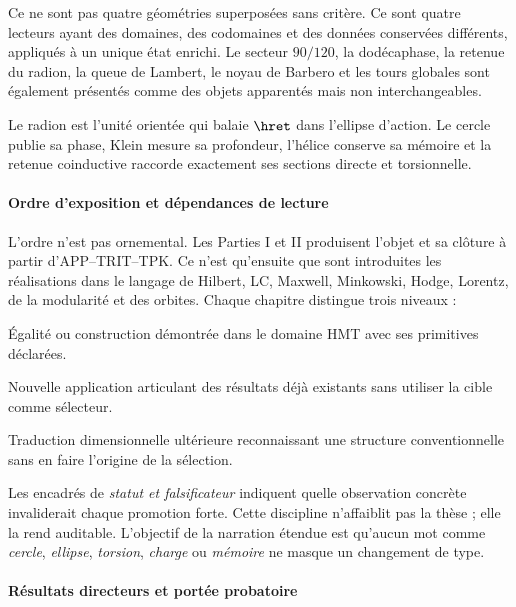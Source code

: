 Ce ne sont pas quatre géométries superposées sans critère. Ce sont quatre lecteurs ayant
des domaines, des codomaines et des données conservées différents, appliqués à un unique état
enrichi. Le secteur \(90/120\), la dodécaphase, la retenue du radion, la queue
de Lambert, le noyau de Barbero et les tours globales sont également présentés
comme des objets apparentés mais non interchangeables.

\begin{thesisbox}
Le radion est l'unité orientée qui balaie \(\hret\) dans l'ellipse d'action.
Le cercle publie sa phase, Klein mesure sa profondeur, l'hélice conserve sa
mémoire et la retenue coinductive raccorde exactement ses sections directe et
torsionnelle.
\end{thesisbox}

\paragraph{Ordre d'exposition et dépendances de lecture}

L'ordre n'est pas ornemental. Les Parties I et II produisent l'objet et sa clôture
à partir d'APP--TRIT--TPK. Ce n'est qu'ensuite que sont introduites les réalisations dans le langage
de Hilbert, LC, Maxwell, Minkowski, Hodge, Lorentz, de la modularité et des orbites. Chaque
chapitre distingue trois niveaux :

\begin{description}[style=nextline,leftmargin=4.2cm,labelwidth=3.9cm]
\item[Résultat interne.] Égalité ou construction démontrée dans le domaine
HMT avec ses primitives déclarées.
\item[Formalisation réunie.] Nouvelle application articulant des résultats déjà existants
sans utiliser la cible comme sélecteur.
\item[Interface physique.] Traduction dimensionnelle ultérieure reconnaissant une
structure conventionnelle sans en faire l'origine de la sélection.
\end{description}

Les encadrés de \emph{statut et falsificateur} indiquent quelle observation concrète
invaliderait chaque promotion forte. Cette discipline n'affaiblit pas la thèse ; elle la
rend auditable. L'objectif de la narration étendue est qu'aucun mot
comme \emph{cercle}, \emph{ellipse}, \emph{torsion}, \emph{charge} ou
\emph{mémoire} ne masque un changement de type.

\paragraph{Résultats directeurs et portée probatoire}

